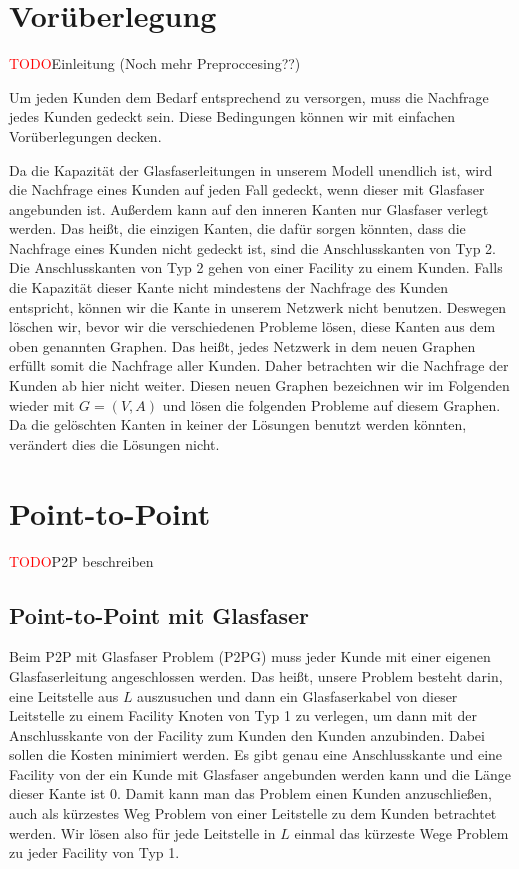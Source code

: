 \documentclass[11pt,a4paper]{article}
\newcommand{\TODO}{\textcolor{red}{TODO}}
\theoremstyle{my_th_style1}
\begin{document}
\section{Vorüberlegung}
\label{preprocess}
\TODO Einleitung (Noch mehr Preproccesing??)

Um jeden Kunden dem Bedarf entsprechend zu versorgen, muss die Nachfrage jedes Kunden gedeckt sein.
Diese Bedingungen k\"onnen wir mit einfachen Vor\"uberlegungen decken.

Da die Kapazität der Glasfaserleitungen in unserem Modell unendlich ist, wird die Nachfrage eines Kunden auf jeden Fall gedeckt, wenn dieser mit Glasfaser angebunden ist.
Außerdem kann auf den inneren Kanten nur Glasfaser verlegt werden. Das heißt, die einzigen Kanten, die dafür sorgen könnten, dass die Nachfrage eines Kunden nicht gedeckt ist, sind die Anschlusskanten von Typ 2.
Die Anschlusskanten von Typ 2 gehen von einer Facility zu einem Kunden.
Falls die Kapazit\"at dieser Kante nicht mindestens der Nachfrage des Kunden entspricht, können wir die Kante in unserem Netzwerk nicht benutzen. 
Deswegen löschen wir, bevor wir die verschiedenen Probleme lösen, diese Kanten aus dem oben genannten Graphen.
Das heißt, jedes Netzwerk in dem neuen Graphen erfüllt somit die Nachfrage aller Kunden.
Daher betrachten wir die Nachfrage der Kunden ab hier nicht weiter.
Diesen neuen Graphen bezeichnen wir im Folgenden wieder mit $G=(V,A)$ und lösen die folgenden Probleme auf diesem Graphen.
Da die gelöschten Kanten in keiner der Lösungen benutzt werden könnten, verändert dies die Lösungen nicht.

\section{Point-to-Point}

\TODO P2P beschreiben

\subsection{Point-to-Point mit Glasfaser}

Beim P2P mit Glasfaser Problem (P2PG) muss jeder Kunde mit einer eigenen Glasfaserleitung angeschlossen werden. Das heißt, unsere Problem besteht darin, eine Leitstelle aus $L$ auszusuchen und dann ein Glasfaserkabel von dieser Leitstelle zu einem Facility Knoten von Typ 1 zu verlegen, um dann mit der Anschlusskante von der Facility zum Kunden den Kunden anzubinden. Dabei sollen die Kosten minimiert werden. Es gibt genau eine Anschlusskante und eine Facility von der ein Kunde mit Glasfaser angebunden werden kann und die Länge dieser Kante ist 0. Damit kann man das Problem einen Kunden anzuschließen, auch als kürzestes Weg Problem von einer Leitstelle zu dem Kunden betrachtet werden. Wir lösen also für jede Leitstelle in $L$ einmal das kürzeste Wege Problem zu jeder Facility von Typ 1.
\end{document}
